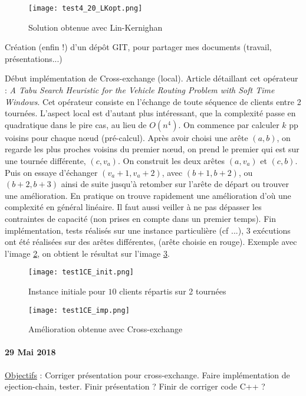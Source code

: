 \documentclass[a4paper,11pt]{article}%
\begin{document}
\begin{figure}[ht]
\centering
\texttt{[image: test4\_20\_LKopt.png]}
	\caption{Solution obtenue avec Lin-Kernighan}	\label{test4_20_LKopt}
\end{figure}

Création (enfin !) d'un dépôt GIT, pour partager mes documents (travail, présentations...)

Début implémentation de Cross-exchange (local). Article détaillant cet opérateur : \emph{A Tabu Search Heuristic for the Vehicle Routing Problem with Soft Time Windows}. Cet opérateur consiste en l'échange de toute séquence de clients entre 2 tournées. L'aspect local est d'autant plus intéressant, que la complexité passe en quadratique dans le pire cas, au lieu de $O(n^4)$. 
On commence par calculer $k$ pp voisins pour chaque nœud (pré-calcul). Après avoir choisi une arête $(a,b)$, on regarde les plus proches voisins du premier nœud, on prend le premier qui est sur une tournée différente, $(c,v_a)$. 
On construit les deux arêtes $(a,v_a)$ et $(c,b)$. Puis on essaye d'échanger $(v_a+1, v_a+2)$, avec $(b+1,b+2)$, ou $(b+2,b+3)$ ainsi de suite jusqu'à retomber sur l'arête de départ ou trouver une amélioration. 
En pratique on trouve rapidement une amélioration d'où une complexité en général linéaire. 
Il faut aussi veiller à ne pas dépasser les contraintes de capacité (non prises en compte dans un premier temps). 
Fin implémentation, tests réalisés sur une instance particulière (cf ...), 3 exécutions ont été réalisées sur des arêtes différentes, (arête choisie en rouge). Exemple avec l'image \ref{test1CE_init}, on obtient le résultat sur l'image \ref{test1CE_imp}. 

\begin{figure}[ht]
\centering
\texttt{[image: test1CE\_init.png]}
	\caption{Instance initiale pour $10$ clients répartis sur 2 tournées}
	\label{test1CE_init}
\end{figure}

\begin{figure}[ht]
\centering
\texttt{[image: test1CE\_imp.png]}
	\caption{Amélioration obtenue avec Cross-exchange}	
	\label{test1CE_imp}
\end{figure}

\paragraph*{29 Mai 2018}

\underline{Objectifs} : Corriger présentation pour cross-exchange. Faire implémentation de ejection-chain, tester. Finir présentation ? Finir de corriger code C++ ?
\end{document}
